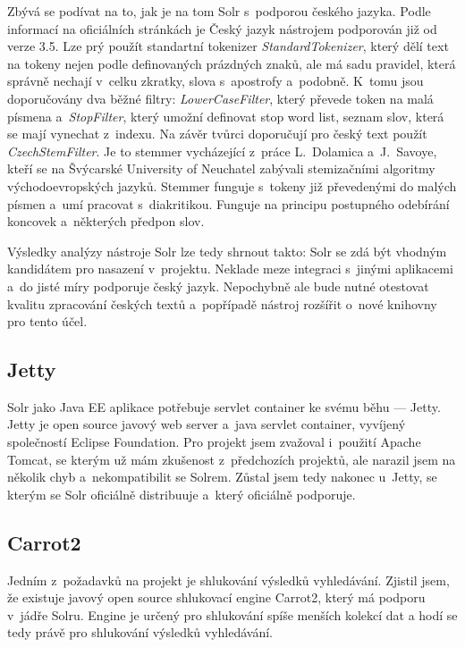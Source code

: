 Zbývá se podívat na to, jak je na tom Solr s~podporou českého jazyka. Podle informací na oficiálních stránkách\cite{sorl:wiki} je Český jazyk nástrojem podporován již od verze 3.5. Lze prý použít standartní tokenizer \emph{StandardTokenizer}, který dělí text na tokeny nejen podle definovaných prázdných znaků, ale má sadu pravidel, která správně nechají v~celku zkratky, slova s~apostrofy a~podobně. K~tomu jsou doporučovány dva běžné filtry: \emph{LowerCaseFilter}, který převede token na malá písmena a~\emph{StopFilter}, který umožní definovat stop word list, seznam slov, která se mají vynechat z~indexu. Na závěr tvůrci doporučují pro český text použít \emph{CzechStemFilter}. Je to stemmer vycházející z~práce L.~Dolamica a~J.~Savoye, kteří se na Švýcarské University of Neuchatel zabývali stemizačními algoritmy východoevropských jazyků. Stemmer funguje s~tokeny již převedenými do malých písmen a~umí pracovat s~diakritikou. Funguje na principu postupného odebírání koncovek a~některých předpon slov.

Výsledky analýzy nástroje Solr lze tedy shrnout takto: Solr se zdá být vhodným kandidátem pro nasazení v~projektu. Neklade meze integraci s~jinými aplikacemi a~do jisté míry podporuje český jazyk. Nepochybně ale bude nutné otestovat kvalitu zpracování českých textů a~popřípadě nástroj rozšířit o~nové knihovny pro tento účel.

\subsection{Jetty}
Solr jako Java EE aplikace potřebuje servlet container ke svému běhu — Jetty. Jetty\cite{jetty:doc} je open source javový web server a~java servlet container, vyvíjený společností Eclipse Foundation. Pro projekt jsem zvažoval i~použití Apache Tomcat\cite{tomcat:doc}, se kterým už mám zkušenost z~předchozích projektů, ale narazil jsem na několik chyb a~nekompatibilit se Solrem. Zůstal jsem tedy nakonec u~Jetty, se kterým se Solr oficiálně distribuuje a~který oficiálně podporuje.

\subsection{Carrot2}
Jedním z~požadavků na projekt je shlukování výsledků vyhledávání. Zjistil jsem, že existuje javový open source shlukovací engine Carrot2\cite{carrot2:manual}, který má podporu v~jádře Solru. Engine je určený pro shlukování spíše menších kolekcí dat a hodí se tedy právě pro shlukování výsledků vyhledávání.

